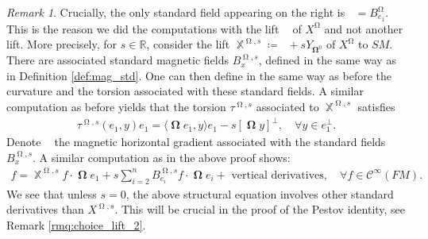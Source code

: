 \documentclass[12pt]{amsart}
\numberwithin{numbering}{section}
\theoremstyle{plain}
\theoremstyle{definition}
\theoremstyle{remark}
\newtheorem{rmq}[numbering]{Remark}
\numberwithin{equation}{section}
\DeclareMathOperator{\nhss}{\nabla_{\mathbb{H}^{\mg, s}}}
\DeclareMathOperator{\xx}{\mathbb{X}}
\DeclareMathOperator{\xs}{\mathbb{X}^{\mg}}
\DeclareMathOperator{\oo}{\mathbf{\Omega}}
\DeclareMathOperator{\mg}{\Omega}
\newcommand{\R}{\mathbb{R}}
\begin{document}
\begin{rmq} \label{rmq:choice_lift}
Crucially, the only standard field appearing on the right is $\xs = B_{e_1}^{\mg}$. This is the reason we did the computations with the lift $\xs$ of $X^{\mg}$ and not another lift. More precisely, for $s \in \R$, consider the lift $\xx^{\mg, s} \coloneq \xs + s Y_{\oo^0}$ of $X^{\mg}$ to $SM$. There are associated standard magnetic fields $B_x^{\mg, s}$, defined in the same way as in Definition \ref{def:mag_std}. One can then define in the same way as before the curvature and the torsion associated with these standard fields. A similar computation as before yields that the torsion $\tau^{\mg, s}$ associated to $\xx^{\mg, s}$ satisfies 
\begin{align*}
\tau^{\mg, s}(e_1, y) e_1 = \langle \oo e_1, y \rangle e_1 - s [\oo y]^\perp, \quad \forall y \in e_1^\perp.
\end{align*}
Denote $\nhss$ the magnetic horizontal gradient associated with the standard fields $B_x^{\mg, s}$. A similar computation as in the above proof shows:
\begin{align*}
[\xx^{\mg, s}, \nhss] f = \xx^{\mg, s} f \cdot \oo e_1 + s \sum_{i=2}^n B^{\mg, s}_{e_i} f \cdot \oo e_i + \text{ vertical derivatives}, \quad \forall f \in \mathcal{C}^\infty(FM).
\end{align*}
We see that unless $s = 0$, the above structural equation involves other standard derivatives than $X^{\mg, s}$. This will be crucial in the proof of the Pestov identity, see Remark \ref{rmq:choice_lift_2}.
\end{rmq}
\end{document}
